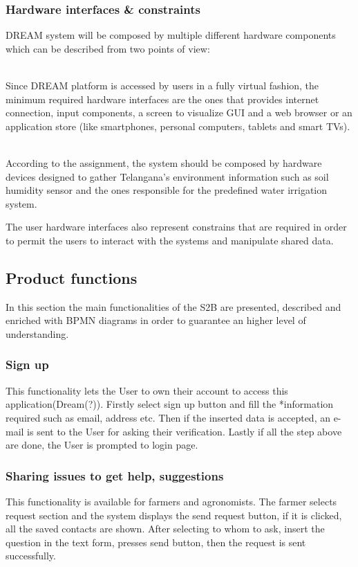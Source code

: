 \subsubsection{Hardware interfaces \& constraints}
DREAM system will be composed by multiple different hardware components which can be described from two points of view:
\begin{description}[font=~\normalfont\scshape]
    \item[\textbf{\textcolor{myblue}{user perspective}}] \hfill \\Since DREAM platform is accessed by users in a fully virtual fashion, the minimum required hardware interfaces are the ones that provides internet connection, input components, a screen to visualize GUI and a web browser or an application store (like smartphones, personal computers, tablets and smart TVs).
    \item[\textbf{\textcolor{myblue}{system perspective}}] \hfill \\According to the assignment, the system should be composed by hardware devices designed to gather Telangana's environment information such as soil humidity sensor and the ones responsible for the predefined water irrigation system.
\end{description}
The user hardware interfaces also represent constrains that are required in order to permit the users to interact with the systems and manipulate shared data.

\subsection{Product functions}
\label{sect:product_functions}
In this section the main functionalities of the S2B are presented, described and enriched with BPMN diagrams in order to guarantee an higher level of understanding.
\subsubsection{Sign up}
This functionality lets the User to own their account to access this application(Dream(?)).
Firstly select sign up button and fill the *information required such as email, address etc.
Then if the inserted data is accepted, an e-mail is sent to the User for asking their
verification.
Lastly if all the step above are done, the User is prompted to login page.
\subsubsection{Sharing issues to get help, suggestions}
This functionality is available for farmers and agronomists. The farmer selects request 
section and the system displays the send request button, if it is clicked, all the saved 
contacts are shown. After selecting to whom to ask, insert the question in the text form,
presses send button, then the request is sent successfully.
